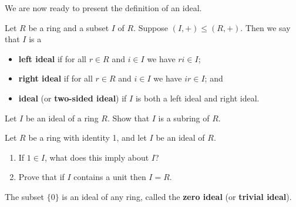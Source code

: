 We are now ready to present the definition of an ideal.
\begin{definition}
    Let $R$ be a ring and a subset $I$ of $R$. Suppose $(I,+) \leq (R,+)$. Then we say that $I$ is a
    \begin{itemize}
        \item \textbf{left ideal} if for all $r \in R$ and $i \in I$ we have $ri \in I$;
        \item \textbf{right ideal} if for all $r \in R$ and $i \in I$ we have $ir \in I$; and
        \item \textbf{ideal} (or \textbf{two-sided ideal}) if $I$ is both a left ideal and right ideal.
    \end{itemize} 
\end{definition}
\begin{exercise}\label{exercise-ideal-is-a-subring}
    Let $I$ be an ideal of a ring $R$. Show that $I$ is a subring of $R$.
\end{exercise}
\begin{exercise}
    Let $R$ be a ring with identity 1, and let $I$ be an ideal of $R$.
    \begin{enumerate}[label=(\roman*)]
        \item If $1 \in I$, what does this imply about $I$?
        \item Prove that if $I$ contains a unit then $I = R$.
    \end{enumerate}
\end{exercise}

\begin{example}
    The subset $\{0\}$ is an ideal of any ring, called the \textbf{zero ideal} (or \textbf{trivial ideal}).
\end{example}

